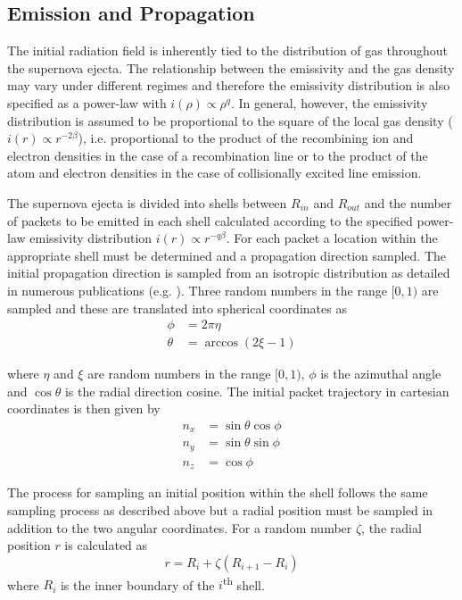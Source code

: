 \subsection{Emission and Propagation}
\label{sctn:em_prop}
The initial radiation field is inherently tied to the distribution of gas throughout the supernova ejecta.  The relationship between the emissivity and the gas density may vary under different regimes and therefore the emissivity distribution is also specified as a power-law with $i(\rho) \propto \rho^{q}$.  In general, however, the emissivity distribution is assumed to be proportional to the square of the local gas density ($i(r) \propto r ^{-2\beta}$), i.e. proportional to the product of the recombining 
ion and electron densities in the case of a recombination line or to the product of the atom and electron densities in the case of collisionally excited line emission.

The supernova ejecta is divided into shells between $R_{in}$ and $R_{out}$ and the number of packets to be emitted in each shell calculated according to the specified power-law emissivity distribution $i(r) \propto r^{-q\beta }$.  For each packet a location within the appropriate shell must be determined and a propagation direction sampled.  The initial propagation direction is sampled from an isotropic distribution as detailed in numerous publications (e.g. \citet{Wood2004}). Three random numbers in the range $[0,1)$ are sampled and these are translated into spherical coordinates as 
\begin{align}
\label{eqn:isotropic}
\phi&=2\pi\eta \\
\theta&=\arccos(2\xi -1) 
\end{align}

\noindent where $\eta$ and $\xi$  are random numbers in the range $[0,1)$, $\phi$ is the azimuthal angle and $\cos \theta$ is the radial direction cosine.  The initial packet trajectory in cartesian coordinates is then given by 
\begin{align}
n_x&=\sin\theta\cos\phi \\
n_y&=\sin\theta\sin\phi \\
n_z&=\cos\phi
\label{eqn:isotropic2}
\end{align}

The process for sampling an initial position within the shell follows the same sampling process as described above  but a radial position must be sampled in addition to the two angular coordinates.  For a random number $\zeta$, the radial position $r$ is calculated as
\begin{equation}
r=R_i+\zeta(R_{i+1}-R_i)
\label{eqn:isotropic3}
\end{equation}
\noindent where $R_i$ is the inner boundary of the $i$\textsuperscript{th} shell.

